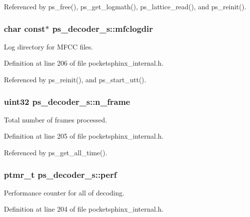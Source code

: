 Referenced by ps\-\_\-free(), ps\-\_\-get\-\_\-logmath(), ps\-\_\-lattice\-\_\-read(), and ps\-\_\-reinit().

\subsubsection[{mfclogdir}]{\setlength{\rightskip}{0pt plus 5cm}char const$\ast$ ps\-\_\-decoder\-\_\-s\-::mfclogdir}\label{structps__decoder__s_a8bb5ef8791798b8dd9bc82b1ec016663}


Log directory for M\-F\-C\-C files. 



Definition at line 206 of file pocketsphinx\-\_\-internal.\-h.



Referenced by ps\-\_\-reinit(), and ps\-\_\-start\-\_\-utt().

\subsubsection[{n\-\_\-frame}]{\setlength{\rightskip}{0pt plus 5cm}uint32 ps\-\_\-decoder\-\_\-s\-::n\-\_\-frame}\label{structps__decoder__s_a2886b321c576c7def449ebb2f37899fd}


Total number of frames processed. 



Definition at line 205 of file pocketsphinx\-\_\-internal.\-h.



Referenced by ps\-\_\-get\-\_\-all\-\_\-time().

\subsubsection[{perf}]{\setlength{\rightskip}{0pt plus 5cm}ptmr\-\_\-t ps\-\_\-decoder\-\_\-s\-::perf}\label{structps__decoder__s_ab42d1d1e300d2a6df5dd3cd796a27d43}


Performance counter for all of decoding. 



Definition at line 204 of file pocketsphinx\-\_\-internal.\-h.



